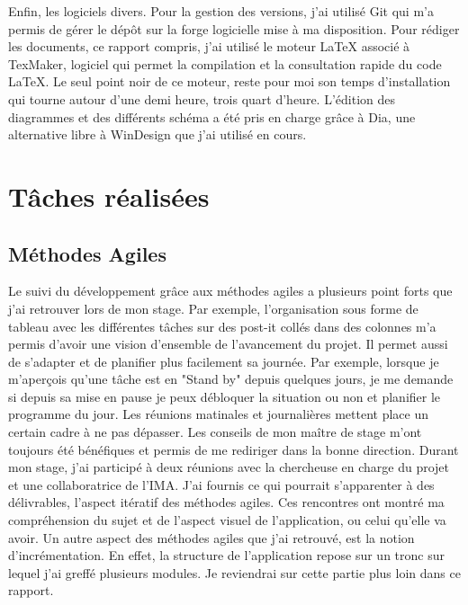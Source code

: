 \documentclass[12pt,a4paper,titlepage,twoside]{report}
\begin{document}
Enfin, les logiciels divers. Pour la gestion des versions, j'ai utilisé Git qui m'a permis de gérer le dépôt sur la forge logicielle mise à ma disposition. Pour rédiger les documents, ce rapport compris, j'ai utilisé le moteur LaTeX associé à TexMaker, logiciel qui permet la compilation et la consultation rapide du code LaTeX. Le seul point noir de ce moteur, reste pour moi son temps d'installation qui tourne autour d'une demi heure, trois quart d'heure. L'édition des diagrammes et des différents schéma a été pris en charge grâce à Dia, une alternative libre à WinDesign que j'ai utilisé en cours.

 
\chapter{Tâches réalisées}
\section{Méthodes Agiles}
Le suivi du développement grâce aux méthodes agiles a plusieurs point forts que j'ai retrouver lors de mon stage. Par exemple, l'organisation sous forme de tableau avec les différentes tâches sur des post-it collés dans des colonnes m'a permis d'avoir une vision d'ensemble de l'avancement du projet. Il permet aussi de s'adapter et de planifier plus facilement sa journée. Par exemple, lorsque je m'aperçois qu'une tâche est en "Stand by" depuis quelques jours, je me demande si depuis sa mise en pause je peux débloquer la situation ou non et planifier le programme du jour.
Les réunions matinales et journalières mettent place un certain cadre à ne pas dépasser. Les conseils de mon maître de stage m'ont toujours été bénéfiques et permis de me rediriger dans la bonne direction.
Durant mon stage, j'ai participé à deux réunions avec la chercheuse en charge du projet et une collaboratrice de l'IMA. J'ai fournis ce qui pourrait s'apparenter à des délivrables, l'aspect itératif des méthodes agiles. Ces rencontres ont montré ma compréhension du sujet et de l'aspect visuel de l'application, ou celui qu'elle va avoir.
Un autre aspect des méthodes agiles que j'ai retrouvé, est la notion d'incrémentation. En effet, la structure de l'application repose sur un tronc sur lequel j'ai greffé plusieurs modules. Je reviendrai sur cette partie plus loin dans ce rapport.
\end{document}
